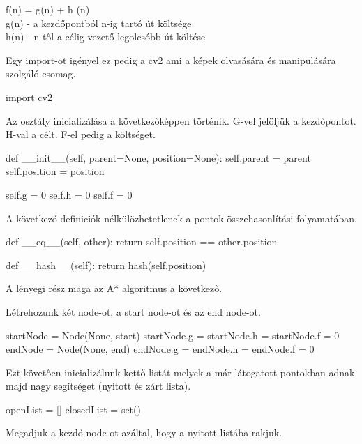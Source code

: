f(n) = g(n) + h (n) \\
g(n) - a kezdőpontból n-ig tartó út költsége \\
h(n) - n-től a célig vezető legolcsóbb út költése 


Egy import-ot igényel ez pedig a cv2 ami a képek olvasására és manipulására szolgáló csomag.

\begin{python}
import cv2

\end{python}

Az osztály inicializálása a következőképpen történik. G-vel jelöljük a kezdőpontot. H-val a célt. F-el pedig a költséget.

\begin{python}
def __init__(self, parent=None, position=None):
    self.parent = parent
    self.position = position

    self.g = 0
    self.h = 0
    self.f = 0

\end{python}

A következő definiciók nélkülözhetetlenek a pontok összehasonlítási folyamatában.

\begin{python}
def __eq__(self, other):
        return self.position == other.position

def __hash__(self):
        return hash(self.position)

\end{python}

A lényegi rész maga az A* algoritmus a következő.

Létrehozunk két node-ot, a start node-ot és az end node-ot.

\begin{python}
    startNode = Node(None, start)
    startNode.g = startNode.h = startNode.f = 0
    endNode = Node(None, end)
    endNode.g = endNode.h = endNode.f = 0
\end{python}

Ezt követően inicializálunk kettő listát melyek a már látogatott pontokban adnak majd nagy segítséget (nyitott és zárt lista).

\begin{python}
    openList = []
    closedList = set()
\end{python}

Megadjuk a kezdő node-ot azáltal, hogy a nyitott listába rakjuk.

